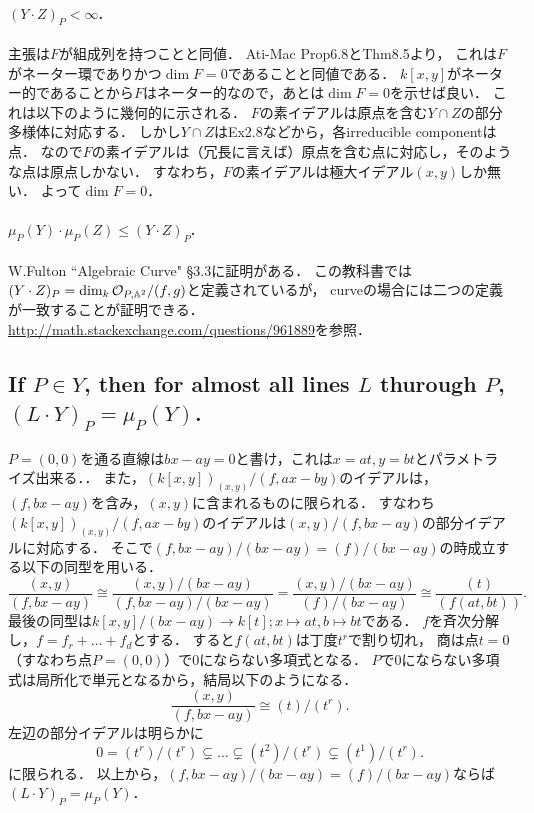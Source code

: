 \documentclass[a4paper]{jsarticle}
\begin{document}
    \paragraph{$(Y \cdot Z)_P < \infty$.}
    主張は$F$が組成列を持つことと同値．
    Ati-Mac Prop6.8とThm8.5より，
    これは$F$がネーター環でありかつ$\dim F=0$であることと同値である．
    $k[x,y]$がネーター的であることから$F$はネーター的なので，あとは$\dim F=0$を示せば良い．
    これは以下のように幾何的に示される．
    $F$の素イデアルは原点を含む$Y \cap Z$の部分多様体に対応する．
    しかし$Y \cap Z$はEx2.8などから，各irreducible componentは点．
    なので$F$の素イデアルは（冗長に言えば）原点を含む点に対応し，そのような点は原点しかない．
    すなわち，$F$の素イデアルは極大イデアル$(x,y)$しか無い．
    よって$\dim F=0$．

    \paragraph{$\mu_P(Y) \cdot \mu_P(Z) \leq (Y \cdot Z)_P$.}
    W.Fulton ``Algebraic Curve" \S 3.3に証明がある．
    この教科書では$(Y \cdot Z)_P=\dim_k \mathcal{O}_{P, \mathbb{A}^2}/(f,g)$と定義されているが，
    curveの場合には二つの定義が一致することが証明できる．
    \url{http://math.stackexchange.com/questions/961889}を参照．

    \subsection{If $P \in Y$, then for almost all lines $L$ thurough $P$, $(L \cdot Y)_P=\mu_P(Y)$.}
    $P=(0,0)$を通る直線は$bx-ay=0$と書け，これは$x=at, y=bt$とパラメトライズ出来る．．
    また，$(k[x,y])_{(x,y)}/(f,ax-by)$のイデアルは，
    $(f,bx-ay)$を含み，$(x,y)$に含まれるものに限られる．
    すなわち$(k[x,y])_{(x,y)}/(f,ax-by)$のイデアルは$(x,y)/(f,bx-ay)$の部分イデアルに対応する．
    そこで$(f,bx-ay)/(bx-ay)=(f)/(bx-ay)$の時成立する以下の同型を用いる．
    \[
        \frac{(x,y)}{(f,bx-ay)}
        \cong \frac{(x,y)/(bx-ay)}{(f,bx-ay)/(bx-ay)}
        =\frac{(x,y)/(bx-ay)}{(f)/(bx-ay)}
        \cong \frac{(t)}{(f(at,bt))}.
    \]
    最後の同型は$k[x,y]/(bx-ay) \to k[t]; x \mapsto at, b \mapsto bt$である．
    $f$を斉次分解し，$f=f_r+\dots+f_d$とする．
    すると$f(at,bt)$は丁度$t^r$で割り切れ，
    商は点$t=0$（すなわち点$P=(0,0)$）で0にならない多項式となる．
    $P$で0にならない多項式は局所化で単元となるから，結局以下のようになる．
    \[ \frac{(x,y)}{(f,bx-ay)} \cong (t)/(t^r). \]
    左辺の部分イデアルは明らかに
    \[ 0=(t^r)/(t^r) \subsetneq \dots \subsetneq (t^2)/(t^r) \subsetneq (t^1)/(t^r). \]
    に限られる．
    以上から，$(f,bx-ay)/(bx-ay)=(f)/(bx-ay)$ならば$(L \cdot Y)_P=\mu_P(Y)$．
\end{document}
